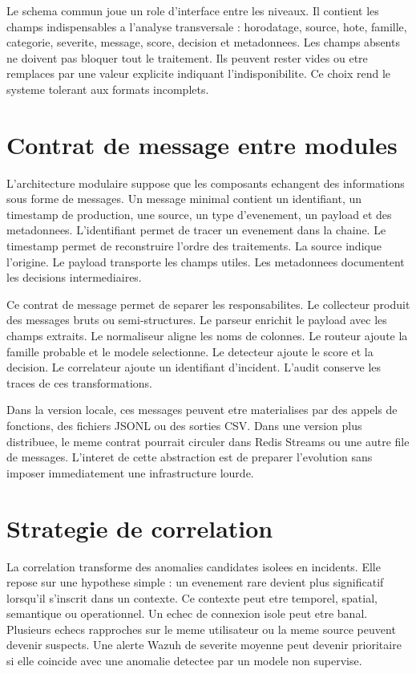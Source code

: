 Le schema commun joue un role d'interface entre les niveaux. Il contient les champs indispensables a l'analyse transversale : horodatage, source, hote, famille, categorie, severite, message, score, decision et metadonnees. Les champs absents ne doivent pas bloquer tout le traitement. Ils peuvent rester vides ou etre remplaces par une valeur explicite indiquant l'indisponibilite. Ce choix rend le systeme tolerant aux formats incomplets.

\section{Contrat de message entre modules}
L'architecture modulaire suppose que les composants echangent des informations sous forme de messages. Un message minimal contient un identifiant, un timestamp de production, une source, un type d'evenement, un payload et des metadonnees. L'identifiant permet de tracer un evenement dans la chaine. Le timestamp permet de reconstruire l'ordre des traitements. La source indique l'origine. Le payload transporte les champs utiles. Les metadonnees documentent les decisions intermediaires.

Ce contrat de message permet de separer les responsabilites. Le collecteur produit des messages bruts ou semi-structures. Le parseur enrichit le payload avec les champs extraits. Le normaliseur aligne les noms de colonnes. Le routeur ajoute la famille probable et le modele selectionne. Le detecteur ajoute le score et la decision. Le correlateur ajoute un identifiant d'incident. L'audit conserve les traces de ces transformations.

Dans la version locale, ces messages peuvent etre materialises par des appels de fonctions, des fichiers JSONL ou des sorties CSV. Dans une version plus distribuee, le meme contrat pourrait circuler dans Redis Streams ou une autre file de messages. L'interet de cette abstraction est de preparer l'evolution sans imposer immediatement une infrastructure lourde.

\section{Strategie de correlation}
La correlation transforme des anomalies candidates isolees en incidents. Elle repose sur une hypothese simple : un evenement rare devient plus significatif lorsqu'il s'inscrit dans un contexte. Ce contexte peut etre temporel, spatial, semantique ou operationnel. Un echec de connexion isole peut etre banal. Plusieurs echecs rapproches sur le meme utilisateur ou la meme source peuvent devenir suspects. Une alerte Wazuh de severite moyenne peut devenir prioritaire si elle coincide avec une anomalie detectee par un modele non supervise.

